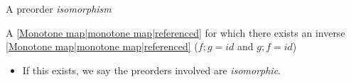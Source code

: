 
A preorder \emph{isomorphism}

A \ref{Monotone map|monotone map|referenced} for which there exists an inverse \ref{Monotone map|monotone map|referenced} ($f;g=id$ and $g;f = id$)
  \begin{itemize}
    \item  If this exists, we say the preorders involved are \emph{isomorphic}.
  \end{itemize}